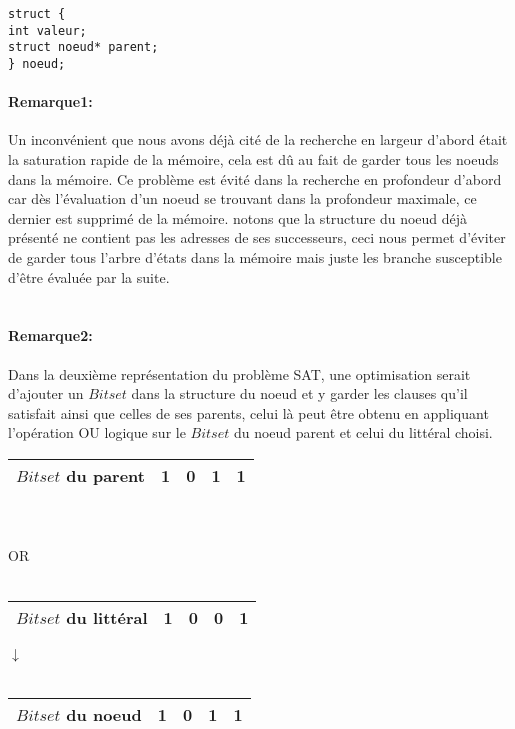 \begin{lstlisting}
struct {
int valeur; 
struct noeud* parent;
} noeud;
\end{lstlisting}

\paragraph{Remarque1:}\label{BreadthIssue} Un inconvénient que nous avons déjà cité de la recherche en largeur d’abord était la saturation rapide de la mémoire, cela est dû au fait de garder tous les noeuds dans la mémoire. Ce problème est évité dans la recherche en profondeur d’abord car dès l’évaluation d’un noeud se trouvant dans la profondeur maximale, ce dernier est supprimé de la mémoire. notons que la structure du noeud déjà présenté ne contient pas les adresses de ses successeurs, ceci nous permet d’éviter de garder tous l’arbre d’états dans la mémoire mais juste les branche susceptible d’être évaluée par la suite.\\~\\
\paragraph{Remarque2:} Dans la deuxième représentation du problème SAT, une optimisation serait d’ajouter un $Bitset$ dans la structure du noeud et y garder les clauses qu’il satisfait ainsi que celles de ses parents, celui là peut être obtenu en appliquant l’opération OU logique sur le $Bitset$ du noeud parent et celui du littéral choisi.\\
\begin{center}
	\begin{minipage}{0.5\textwidth}
		\centering
		\begin{tabular}{|c | c| c| c|c|}
			\hline
			$Bitset$ du parent& 1 & 0 & 1 & 1 \\\hline
		\end{tabular}
	\end{minipage}
	\\~\\
	OR
	\\~\\
	\begin{minipage}{0.5\textwidth}
		\centering
		\begin{tabular}{|c | c| c| c|c|}
			\hline
			$Bitset$ du littéral& 1 & 0 & 0 & 1\\\hline
		\end{tabular}
	\end{minipage}
	\begin{center}

		$\downarrow$
		\\~\\
		\begin{tabular}{|c | c| c| c|c|}
			\hline
			$Bitset$ du noeud& 1 & 0 & 1 & 1\\\hline
		\end{tabular}
	\end{center}
\end{center}

